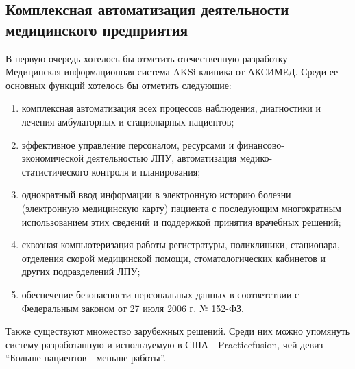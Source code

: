 \subsection{Комплексная автоматизация деятельности медицинского предприятия}
В первую очередь хотелось бы отметить отечественную разработку - Медицинская
информационная система AKSi-клиника от АКСИМЕД. Среди ее основных функций
хотелось бы отметить следующие:

\begin{enumerate}
  \item комплексная автоматизация всех процессов наблюдения, диагностики и
  лечения амбулаторных и стационарных пациентов;
  \item эффективное управление персоналом, ресурсами и
  финансово-\\экономической деятельностью ЛПУ, автоматизация
  медико-\\статистического контроля и планирования;
  \item однократный ввод информации в электронную историю болезни (электронную
  медицинскую карту) пациента с последующим многократным использованием этих сведений и поддержкой принятия врачебных решений;
  \item сквозная компьютеризация работы регистратуры, поликлиники, стационара,
  отделения скорой медицинской помощи, стоматологических кабинетов и других подразделений ЛПУ;
  \item обеспечение безопасности персональных данных в соответствии с
  Федеральным законом от 27 июля 2006 г. № 152-ФЗ.
\end{enumerate}

Также существуют множество зарубежных решений. Среди них можно упомянуть систему
разработанную и используемую в США - Practicefusion, чей девиз “Больше пациентов
- меньше работы”.






